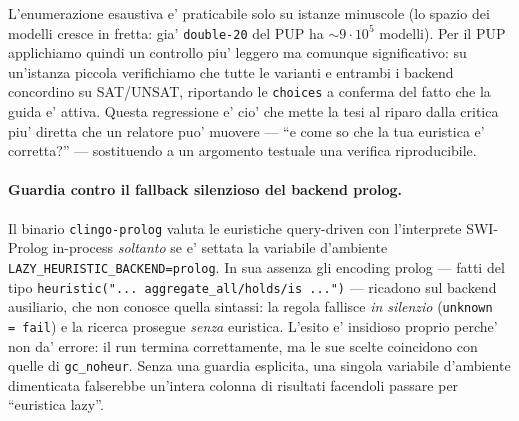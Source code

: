 L'enumerazione esaustiva e' praticabile solo su istanze minuscole (lo spazio dei
modelli cresce in fretta: gia' \texttt{double-20} del PUP ha $\sim\!9\cdot10^5$
modelli). Per il PUP applichiamo quindi un controllo piu' leggero ma comunque
significativo: su un'istanza piccola verifichiamo che tutte le varianti e
entrambi i backend concordino su SAT/UNSAT, riportando le \texttt{choices} a
conferma del fatto che la guida e' attiva. Questa regressione e' cio' che mette
la tesi al riparo dalla critica piu' diretta che un relatore puo' muovere ---
``e come so che la tua euristica e' corretta?'' --- sostituendo a un argomento
testuale una verifica riproducibile.


\paragraph{Guardia contro il fallback silenzioso del backend prolog.}
Il binario \texttt{clingo-prolog} valuta le euristiche query-driven con
l'interprete SWI-Prolog in-process \emph{soltanto} se e' settata la variabile
d'ambiente \texttt{LAZY\_HEURISTIC\_BACKEND=prolog}. In sua assenza gli encoding
prolog --- fatti del tipo
\texttt{heuristic("... aggregate\_all/holds/is ...")} --- ricadono sul backend
ausiliario, che non conosce quella sintassi: la regola fallisce \emph{in
silenzio} (\texttt{unknown\,=\,fail}) e la ricerca prosegue \emph{senza}
euristica. L'esito e' insidioso proprio perche' non da' errore: il run termina
correttamente, ma le sue scelte coincidono con quelle di \texttt{gc\_noheur}.
Senza una guardia esplicita, una singola variabile d'ambiente dimenticata
falserebbe un'intera colonna di risultati facendoli passare per ``euristica
lazy''.

